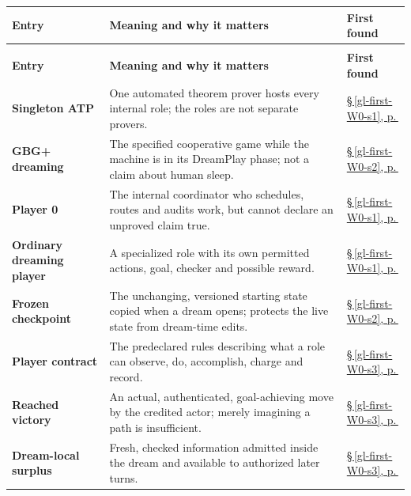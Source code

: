 \documentclass[11pt,letterpaper]{article}
\theoremstyle{definition}
\theoremstyle{plain}
\theoremstyle{definition}
\begin{document}
\begin{longtable}{@{}>{\raggedright\arraybackslash}p{.215\linewidth}>{\raggedright\arraybackslash}p{.585\linewidth}>{\raggedright\arraybackslash}p{.14\linewidth}@{}}
\toprule
\textbf{Entry} & \textbf{Meaning and why it matters} & \textbf{First found} \\
\midrule\endfirsthead
\multicolumn{3}{@{}l}{\footnotesize \emph{Argot: Specialized Terms (continued)}}\\
\toprule\textbf{Entry} & \textbf{Meaning and why it matters} & \textbf{First found} \\
\midrule\endhead
\bottomrule\endfoot
\textbf{Singleton ATP} & One automated theorem prover hosts every internal role; the roles are not separate provers. & \hyperref[gl-first-W0-s1]{\S\,\ref*{gl-first-W0-s1}, p.\,\pageref*{gl-first-W0-s1}} \\
\textbf{GBG+ dreaming} & The specified cooperative game while the machine is in its DreamPlay phase; not a claim about human sleep. & \hyperref[gl-first-W0-s2]{\S\,\ref*{gl-first-W0-s2}, p.\,\pageref*{gl-first-W0-s2}} \\
\textbf{Player 0} & The internal coordinator who schedules, routes and audits work, but cannot declare an unproved claim true. & \hyperref[gl-first-W0-s1]{\S\,\ref*{gl-first-W0-s1}, p.\,\pageref*{gl-first-W0-s1}} \\
\textbf{Ordinary dreaming player} & A specialized role with its own permitted actions, goal, checker and possible reward. & \hyperref[gl-first-W0-s1]{\S\,\ref*{gl-first-W0-s1}, p.\,\pageref*{gl-first-W0-s1}} \\
\textbf{Frozen checkpoint} & The unchanging, versioned starting state copied when a dream opens; protects the live state from dream-time edits. & \hyperref[gl-first-W0-s2]{\S\,\ref*{gl-first-W0-s2}, p.\,\pageref*{gl-first-W0-s2}} \\
\textbf{Player contract} & The predeclared rules describing what a role can observe, do, accomplish, charge and record. & \hyperref[gl-first-W0-s3]{\S\,\ref*{gl-first-W0-s3}, p.\,\pageref*{gl-first-W0-s3}} \\
\textbf{Reached victory} & An actual, authenticated, goal-achieving move by the credited actor; merely imagining a path is insufficient. & \hyperref[gl-first-W0-s3]{\S\,\ref*{gl-first-W0-s3}, p.\,\pageref*{gl-first-W0-s3}} \\
\textbf{Dream-local surplus} & Fresh, checked information admitted inside the dream and available to authorized later turns. & \hyperref[gl-first-W0-s3]{\S\,\ref*{gl-first-W0-s3}, p.\,\pageref*{gl-first-W0-s3}} \\

\end{longtable}
\end{document}

